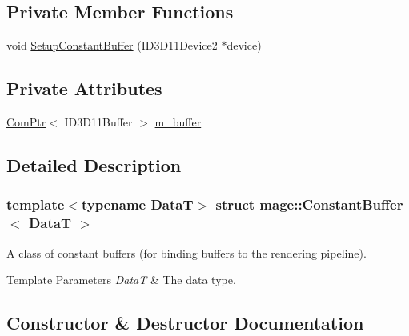 \subsection*{Private Member Functions}
\begin{DoxyCompactItemize}
\item 
void \hyperlink{structmage_1_1_constant_buffer_af4a528d143bb7856a1a484cfee65fec7}{Setup\+Constant\+Buffer} (I\+D3\+D11\+Device2 $\ast$device)
\end{DoxyCompactItemize}
\subsection*{Private Attributes}
\begin{DoxyCompactItemize}
\item 
\hyperlink{namespacemage_ae74f374780900893caa5555d1031fd79}{Com\+Ptr}$<$ I\+D3\+D11\+Buffer $>$ \hyperlink{structmage_1_1_constant_buffer_a394571e3102fe053f3357e2e218c0eda}{m\+\_\+buffer}
\end{DoxyCompactItemize}


\subsection{Detailed Description}
\subsubsection*{template$<$typename DataT$>$\newline
struct mage\+::\+Constant\+Buffer$<$ Data\+T $>$}

A class of constant buffers (for binding buffers to the rendering pipeline).


\begin{DoxyTemplParams}{Template Parameters}
{\em DataT} & The data type. \\
\hline
\end{DoxyTemplParams}


\subsection{Constructor \& Destructor Documentation}
\hypertarget{structmage_1_1_constant_buffer_a3badd88f8570d6622f6eb33c7420a87d}{}\label{structmage_1_1_constant_buffer_a3badd88f8570d6622f6eb33c7420a87d} 

